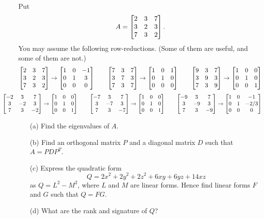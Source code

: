 \documentclass[a4paper]{article}
\begin{document}
\begin{problem}[Mock 2]
 Put 
 \[ A = \left[\begin{matrix} 2&3&7 \\ 3&2&3 \\ 7&3&2 \end{matrix}\right]. 
 \]
 You may assume the following row-reductions.  (Some of them are
 useful, and some of them are not.)
 \[
   \left[\begin{matrix}
   2&3&7\\
   3&2&3\\
   7&3&2\\
   \end{matrix}\right] \to 
   \left[\begin{matrix}
   1&0&-1\\
   0&1&3\\
   0&0&0\\
   \end{matrix}\right] \qquad
   \left[\begin{matrix}
   7&3&7\\
   3&7&3\\
   7&3&7\\
   \end{matrix}\right] \to
   \left[\begin{matrix}
   1&0&1\\
   0&1&0\\
   0&0&0\\
   \end{matrix}\right] \qquad
   \left[\begin{matrix}
   9&3&7\\
   3&9&3\\
   7&3&9\\
   \end{matrix}\right] \to
   \left[\begin{matrix}
   1&0&0\\
   0&1&0\\
   0&0&1\\
   \end{matrix}\right]
  \] \[
   \hspace{-3em}
   \bbm
   -2&3&7\\
   3&-2&3\\
   7&3&-2\\
   \ebm \to
   \bbm
   1&0&0\\
   0&1&0\\
   0&0&1\\
   \ebm \qquad
   \bbm
   -7&3&7\\
   3&-7&3\\
   7&3&-7\\
   \ebm \to
   \bbm
   1&0&0\\
   0&1&0\\
   0&0&1\\
   \ebm \qquad
   \bbm
   -9&3&7\\
   3&-9&3\\
   7&3&-9\\
   \ebm \to
   \bbm
   1&0&-1\\
   0&1&-2/3\\
   0&0&0\\
   \ebm
  \]
 \begin{itemize}
  \item[(a)] Find the eigenvalues of $A$. 
  \item[(b)] Find an orthogonal matrix $P$ and a diagonal matrix $D$
   such that $A=PDP^T$. 
  \item[(c)] Express the quadratic form
   \[ Q = 2x^2+2y^2+2z^2+6xy+6yz+14xz \]
   as $Q=L^2-M^2$, where $L$ and $M$ are linear forms.  Hence find
   linear forms $F$ and $G$ such that $Q=FG$.
  \item[(d)] What are the rank and signature of $Q$? 
 \end{itemize}
\end{problem}
\end{document}
